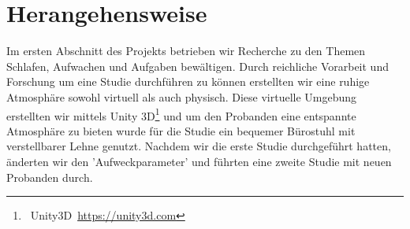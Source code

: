 \section{Herangehensweise}\label{sec:approach}

Im ersten Abschnitt des Projekts betrieben wir Recherche zu den Themen Schlafen, Aufwachen und Aufgaben bewältigen. Durch reichliche Vorarbeit und Forschung um eine Studie durchführen zu können erstellten wir eine ruhige Atmosphäre sowohl virtuell als auch physisch. Diese virtuelle Umgebung erstellten wir mittels Unity 3D\footnote{~Unity3D~\url{https://unity3d.com}} und um den Probanden eine entspannte Atmosphäre zu bieten wurde für die Studie ein bequemer Bürostuhl mit verstellbarer Lehne genutzt. Nachdem wir die erste Studie durchgeführt hatten, änderten wir den 'Aufweckparameter' und führten eine zweite Studie mit neuen Probanden durch. 